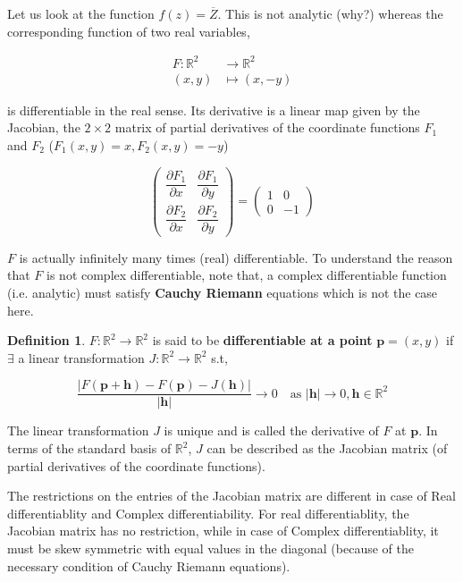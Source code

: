 \documentclass[12pt]{article}
\newcommand{\R}{\mathbb{R}}
\theoremstyle{definition}
\newtheorem{defn}{Definition}
\newenvironment{definition}{
\begin{tcolorbox}[colback=green!5!white,colframe=green!75!black, parbox = false]\begin{defn} }{\end{defn}\end{tcolorbox} }
\newenvironment{note}{
\begin{tcolorbox}[colback=blue!5!white,colframe=blue!75!black,title=Note, parbox = false] }{\end{tcolorbox} }
\begin{document}
Let us look at the function $f(z)=\overline{Z}$. This is not analytic (why?) whereas the corresponding function of two real variables,

\begin{align*}
    F:\R^2&\to \R^2\\
    (x,y)&\mapsto(x,-y)
\end{align*}

is differentiable in the real sense. Its derivative is a linear map given by the Jacobian, the $2\times2$ matrix of partial derivatives of the coordinate functions $F_1$ and $F_2$ ($F_1(x,y)=x,F_2(x,y)=-y$)

\begin{equation*}
\begin{pmatrix}
\dfrac{\partial F_1}{\partial x}&\dfrac{\partial F_1}{\partial y}\\
\dfrac{\partial F_2}{\partial x}&\dfrac{\partial F_2}{\partial y}
\end{pmatrix}
= \begin{pmatrix}
1&0\\
0&-1
\end{pmatrix}
\end{equation*}

$F$ is actually infinitely many times (real) differentiable. To understand the reason that $F$ is not complex differentiable, note that, a complex differentiable function (i.e. analytic) must satisfy \textbf{Cauchy Riemann} equations which is not the case here.

\begin{definition}
$F:\R^2\to\R^2$ is said to be \textbf{differentiable at a point} $\pmb{p}=(x,y)$ if $\exists$ a linear transformation $J:\R^2\to\R^2$ s.t,

\begin{equation*}
    \dfrac{|F(\pmb{p}+\pmb{h})-F(\pmb{p})-J(\pmb{h})|}{|\pmb{h}|}\to 0\quad \text{as } |\pmb{h}|\to 0, \pmb{h}\in\R^2
\end{equation*}

The linear transformation $J$ is unique and is called the derivative of $F$ at $\pmb{p}$. In terms of the standard basis of $\R^2$, $J$ can be described as the Jacobian matrix (of partial derivatives of the coordinate functions).
\end{definition}

\begin{note}
    The restrictions on the entries of the Jacobian matrix are different in case of Real differentiablity and Complex differentiability. For real differentiablity, the Jacobian matrix has no restriction, while in case of Complex differentiablity, it must be skew symmetric with equal values in the diagonal (because of the necessary condition of Cauchy Riemann equations).
\end{note}
\end{document}
